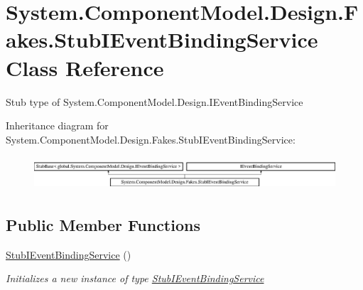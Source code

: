 \hypertarget{class_system_1_1_component_model_1_1_design_1_1_fakes_1_1_stub_i_event_binding_service}{\section{System.\-Component\-Model.\-Design.\-Fakes.\-Stub\-I\-Event\-Binding\-Service Class Reference}
\label{class_system_1_1_component_model_1_1_design_1_1_fakes_1_1_stub_i_event_binding_service}
}


Stub type of System.\-Component\-Model.\-Design.\-I\-Event\-Binding\-Service 


Inheritance diagram for System.\-Component\-Model.\-Design.\-Fakes.\-Stub\-I\-Event\-Binding\-Service\-:\begin{figure}[H]
\begin{center}
\leavevmode
\includegraphics[height=1.258427cm]{class_system_1_1_component_model_1_1_design_1_1_fakes_1_1_stub_i_event_binding_service}
\end{center}
\end{figure}
\subsection*{Public Member Functions}
\begin{DoxyCompactItemize}
\item 
\hyperlink{class_system_1_1_component_model_1_1_design_1_1_fakes_1_1_stub_i_event_binding_service_a003d2a1601100f3665024402e1f11741}{Stub\-I\-Event\-Binding\-Service} ()
\begin{DoxyCompactList}\small\item\em Initializes a new instance of type \hyperlink{class_system_1_1_component_model_1_1_design_1_1_fakes_1_1_stub_i_event_binding_service}{Stub\-I\-Event\-Binding\-Service}\end{DoxyCompactList}\end{DoxyCompactItemize}
